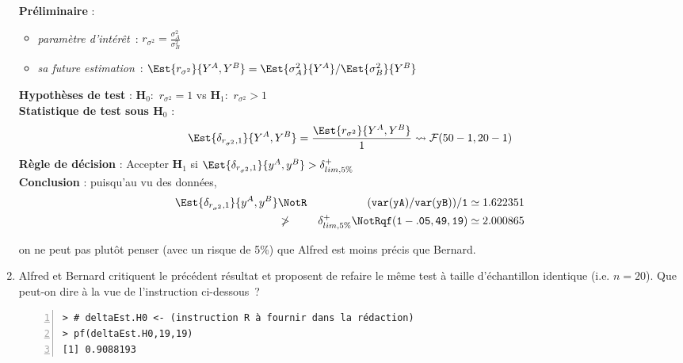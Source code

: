 \documentclass[10pt]{report}
\begin{document}
\begin{exercice}
\begin{enumerate}
\begin{Correction}
\noindent \textbf{Préliminaire} : \begin{itemize}
\item \textit{paramètre d'intérêt}~: $r_{\sigma^2}=\displaystyle \frac{\sigma^2_{A}}{\sigma^2_{B}}$
\item \textit{sa future estimation}~: $\Est{r_{\sigma^2}}{Y^{A},Y^{B}}=\Est{\sigma^2_{A}}{Y^{A}}/\Est{\sigma^2_{B}}{Y^{B}}$
\end{itemize}
\noindent \textbf{Hypothèses de test} : $\mathbf{H}_0:$ $r_{\sigma^2}=1$ vs {\large $\mathbf{H}_1:$ $r_{\sigma^2}>1$}\\
\textbf{Statistique de test sous $\mathbf{H}_0$} :
  $$
  \Est{\delta_{r_{\sigma^2},1}}{Y^{A},Y^{B}}= {\displaystyle \frac{\Est{r_{\sigma^2}}{Y^{A},Y^{B}}}{1}} 
  \leadsto \mathcal{F}(50-1,20-1) 
  $$
\textbf{Règle de décision} : Accepter $\mathbf{H}_1$ si 
  $\Est{\delta_{r_{\sigma^2},1}}{y^{A},y^{B}} > \delta^+_{lim,5\%}$\\
\noindent \textbf{Conclusion} :
puisqu'au vu des données, 
  \begin{eqnarray*}
\Est{\delta_{r_{\sigma^2},1}}{y^{A},y^{B}} &\NotR&\mathtt{(var(yA)/var(yB))/1}\simeq 1.622351\\&\ngtr & \delta^+_{lim,5\%} \NotR \mathtt{qf(1-.05,49,19)}\simeq2.000865
\end{eqnarray*}
  
on ne peut pas plutôt penser (avec un risque de 5\%) que Alfred est moins précis que Bernard.
\end{Correction}



\item Alfred et Bernard critiquent le précédent résultat et proposent de refaire le même test à taille d'échantillon identique (i.e. $n=20$). Que peut-on dire à la vue de l'instruction ci-dessous~?

\IndicR
\begin{Verbatim}[frame=leftline,fontfamily=tt,fontshape=n,numbers=left]
> # deltaEst.H0 <- (instruction R à fournir dans la rédaction)
> pf(deltaEst.H0,19,19)
[1] 0.9088193
\end{Verbatim}




\end{enumerate}
\end{exercice}
\end{document}
